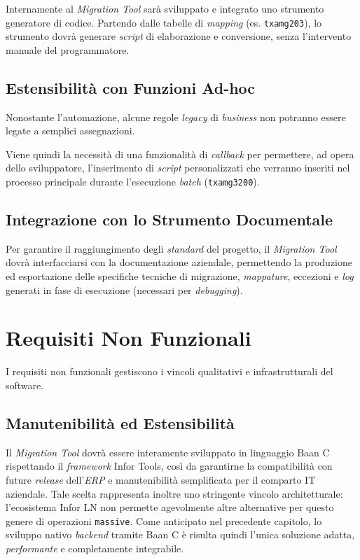 Internamente al \textit{Migration Tool} sarà sviluppato e integrato uno strumento generatore di codice.
Partendo dalle tabelle di \textit{mapping} (es. \texttt{txamg203}), lo strumento dovrà generare \textit{script} di elaborazione e
conversione, %
senza l'intervento manuale del programmatore.

\subsection{Estensibilità con Funzioni Ad-hoc}
Nonostante l'automazione, alcune regole \textit{legacy} di \textit{business} non potranno essere legate a semplici assegnazioni.

Viene quindi la necessità di una funzionalità di \textit{callback} per permettere, ad opera dello sviluppatore, l'inserimento di
\textit{script} personalizzati che verranno inseriti nel processo principale durante l'esecuzione \textit{batch} (\texttt{txamg3200}).

\subsection{Integrazione con lo Strumento Documentale}
Per garantire il raggiungimento degli \textit{standard} del progetto, il \textit{Migration Tool} dovrà interfacciarsi con la
documentazione aziendale, permettendo la produzione ed esportazione delle specifiche tecniche di migrazione,
\textit{mappature}, eccezioni e \textit{log} generati in fase di esecuzione (necessari per \textit{debugging}).

\section{Requisiti Non Funzionali}\label{sec:requisiti-non-funzionali}
I requisiti non funzionali gestiscono i vincoli qualitativi e infrastrutturali del software\cite{sommervilleSoftwareEng}.

\subsection{Manutenibilità ed Estensibilità}\label{subsec:manutenibilita-ed-estensibilita}
Il \textit{Migration Tool} dovrà essere interamente sviluppato in linguaggio Baan C rispettando il \textit{framework} Infor Tools,
così da garantirne la compatibilità con future \textit{release} dell'\textit{ERP} e manutenibilità semplificata per il comparto IT aziendale.
Tale scelta rappresenta inoltre uno stringente vincolo architetturale: l'ecosistema Infor LN non permette agevolmente altre alternative
per questo genere di operazioni \texttt{massive}. Come anticipato nel precedente capitolo, lo sviluppo nativo \textit{backend} tramite Baan C è risulta quindi l'unica soluzione adatta, \textit{performante} e completamente integrabile.

